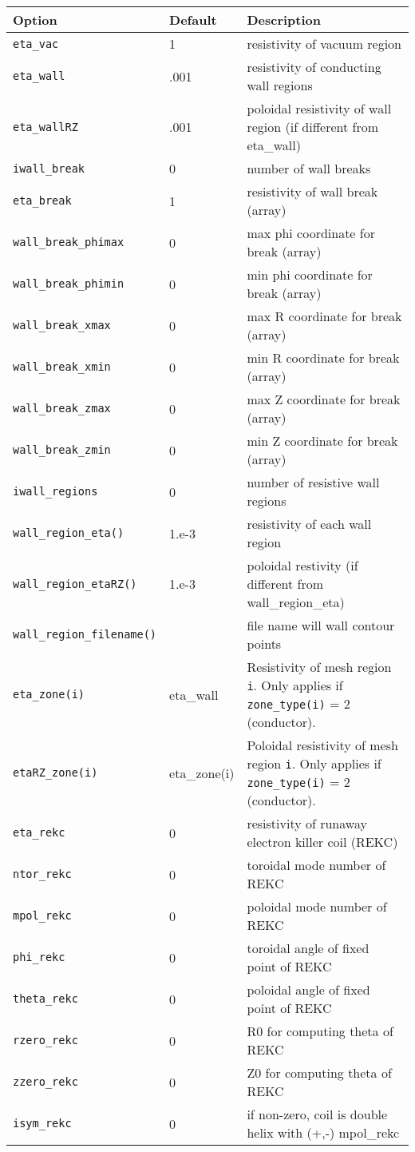 \begin{tabular}{llp{4.5in}}
  \textbf{Option}&\textbf{Default}&\textbf{Description}\\
  \hline
  \texttt{eta\_vac}    & 1 &  resistivity of vacuum region \\
  \texttt{eta\_wall}   & .001 & resistivity of conducting wall regions \\
  \texttt{eta\_wallRZ} & .001 & poloidal resistivity of wall region (if different from eta\_wall) \\
  \texttt{iwall\_break}& 0 & number of wall breaks \\
  \texttt{eta\_break} & 1 & resistivity of wall break (array) \\
  \texttt{wall\_break\_phimax} & 0 & max phi coordinate for break (array) \\
  \texttt{wall\_break\_phimin} & 0 & min phi coordinate for break (array) \\
  \texttt{wall\_break\_xmax}   & 0 & max R coordinate for break (array) \\
  \texttt{wall\_break\_xmin}   & 0 & min R coordinate for break (array) \\
  \texttt{wall\_break\_zmax}   & 0 & max Z coordinate for break (array) \\
  \texttt{wall\_break\_zmin}   & 0 & min Z coordinate for break	(array)	\\ 
  \texttt{iwall\_regions}      & 0 & number of resistive wall regions \\
  \texttt{wall\_region\_eta()}  & 1.e-3 & resistivity of each wall region \\
  \texttt{wall\_region\_etaRZ()}& 1.e-3 & poloidal restivity (if different from wall\_region\_eta) \\
  \texttt{wall\_region\_filename()} & &   file name will wall contour points \\
  \texttt{eta\_zone(i)} & eta\_wall & Resistivity of mesh region \texttt{i}.  Only applies if \texttt{zone\_type(i)} = 2 (conductor).\\
  \texttt{etaRZ\_zone(i)} & eta\_zone(i) & Poloidal resistivity of mesh region \texttt{i}.  Only applies if \texttt{zone\_type(i)} = 2 (conductor).\\ 
  \texttt{eta\_rekc}  & 0 & resistivity of runaway electron killer coil (REKC) \\
  \texttt{ntor\_rekc} & 0 & toroidal mode number of REKC  \\
  \texttt{mpol\_rekc} & 0 & poloidal mode number of REKC \\
  \texttt{phi\_rekc}  & 0 & toroidal angle of fixed point of REKC \\
  \texttt{theta\_rekc}& 0 & poloidal angle of fixed point of REKC \\
  \texttt{rzero\_rekc}& 0 & R0 for computing theta of REKC \\
  \texttt{zzero\_rekc}& 0 & Z0 for computing theta of REKC \\
  \texttt{isym\_rekc} & 0 & if non-zero, coil is double helix with (+,-) mpol\_rekc
\end{tabular}


